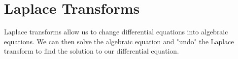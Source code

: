 \chapter{Laplace Transforms}
\noindent
Laplace transforms allow us to change differential equations into algebraic equations. We can then solve the algebraic equation and "undo" the Laplace transform to find the solution to our differential equation.




